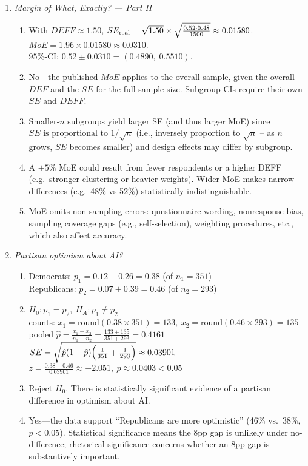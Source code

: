 \documentclass{article}
\begin{document}
\begin{enumerate}
\item \emph{Margin of What, Exactly? — Part II}
\begin{enumerate}[label=(\alph*)]
  \item 
    With $DEFF\approx 1.50$, $SE_{\rm real}=\sqrt{1.50}\times\sqrt{\tfrac{0.52\cdot0.48}{1500}}\approx0.01580$.\\
    $MoE=1.96\times0.01580\approx0.0310$.\\
    $95\%$‑CI: $0.52\pm0.0310=(0.4890,\;0.5510)$.
  \item 
    No—the published $MoE$ applies to the overall sample, given the overall $DEF$ and the $SE$ for the full sample size. Subgroup CIs require their own $SE$ and $DEFF$.
  \item 
    Smaller‐\(n\) subgroups yield larger SE (and thus larger MoE) since $SE \text{ is proportional to }1/\sqrt{n}$ (i.e., inversely proportion to $\sqrt{n}$ -- as $n$ grows, $SE$ becomes smaller) and design effects may differ by subgroup.
  \item 
    A $\pm 5\%$ MoE could result from fewer respondents or a higher DEFF (e.g.\ stronger clustering or heavier weights). Wider MoE makes narrow differences (e.g.\ 48\% vs 52\%) statistically indistinguishable.
  \item 
    MoE omits non‑sampling errors: questionnaire wording, nonresponse bias, sampling coverage gaps (e.g., self-selection), weighting procedures, etc., which also affect accuracy.
\end{enumerate}

\item \emph{Partisan optimism about AI?}
\begin{enumerate}[label=(\alph*)]
  \item 
    Democrats: $p_1=0.12+0.26=0.38$ \quad (of $n_1=351$)\\
    Republicans: $p_2=0.07+0.39=0.46$ \quad (of $n_2=293$)
  \item 
    $H_0:p_1=p_2,\ H_A:p_1\neq p_2$\\
    counts: $x_1=\mathrm{round}(0.38\times 351)=133,\ x_2=\mathrm{round}(0.46\times 293)=135$\\
    pooled $\displaystyle \hat p=\frac{x_1+x_2}{n_1+n_2}=\frac{133+135}{351+293}=0.4161$\\
    $SE=\sqrt{\hat p(1-\hat p)\Bigl(\frac1{351}+\frac1{293}\Bigr)}\approx0.03901$\\
    $z=\frac{0.38-0.46}{0.03901}\approx -2.051,\ p\approx0.0403<0.05$
  \item 
    Reject $H_0$.  There is statistically significant evidence of a partisan difference in optimism about AI.
  \item 
    Yes—the data support “Republicans are more optimistic” (46\% vs.\ 38\%, $p<0.05$).  Statistical significance means the 8pp gap is unlikely under no­-difference; rhetorical significance concerns whether an 8pp gap is substantively important.
\end{enumerate}

\end{enumerate} %
\end{document}

